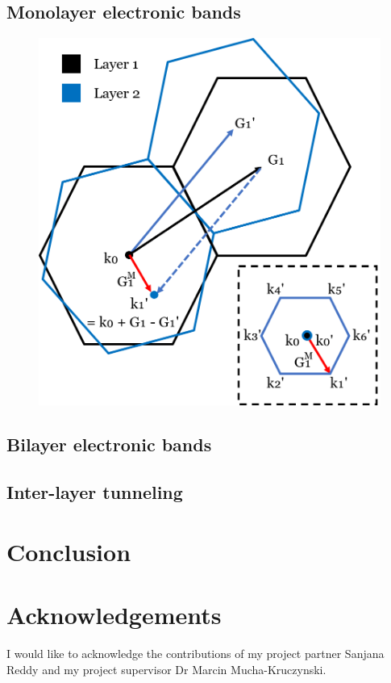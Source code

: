 \documentclass[10pt, twocolumn]{article} %
\begin{document}
\subsection*{Monolayer electronic bands}

\begin{figure}[t!]
\centering
\includegraphics[width=0.95\columnwidth]{k_prime_diagram.png}
  \caption{
  }
  \label{inter-layer_k_prime_diagram}
\end{figure}

\subsection*{Bilayer electronic bands}

\subsection*{Inter-layer tunneling}

\section*{Conclusion}


\section*{Acknowledgements}
I would like to acknowledge the contributions of my project partner Sanjana Reddy and my project supervisor Dr Marcin Mucha-Kruczynski.
\end{document}
